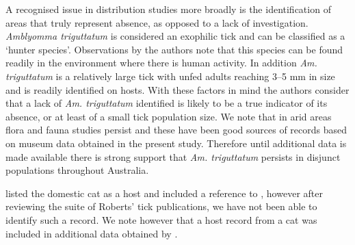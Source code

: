 \documentclass[a4paper, nobind]{templates/ociamthesis}
\begin{document}
A recognised issue in distribution studies more broadly is the identification of areas that truly represent absence, as opposed to a lack of investigation.
\emph{Amblyomma triguttatum} is considered an exophilic tick and can be classified as a `hunter species'.
Observations by the authors note that this species can be found readily in the environment where there is human activity.
In addition \emph{Am. triguttatum} is a relatively large tick with unfed adults reaching 3--5 mm in size \autocite{robertsStatusMorphologicallyDivergent1962} and is readily identified on hosts.
With these factors in mind the authors consider that a lack of \emph{Am. triguttatum} identified is likely to be a true indicator of its absence, or at least of a small tick population size.
We note that in arid areas flora and fauna studies persist and these have been good sources of records based on museum data obtained in the present study.
Therefore until additional data is made available there is strong support that \emph{Am. triguttatum} persists in disjunct populations throughout Australia.

\textcite{waudbyHostsExoticOrnate2007} listed the domestic cat as a host and included a reference to \textcite{robertsAustralianTicks1970}, however after reviewing the suite of Roberts' tick publications, we have not been able to identify such a record.
We note however that a host record from a cat was included in additional data obtained by \textcite{waudbyHostsExoticOrnate2007}.

\clearpage

\begingroup\fontsize{8.5}{10.5}\selectfont
\end{document}
